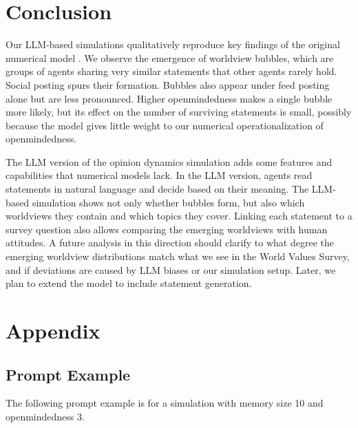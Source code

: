 \documentclass[]{ceurart}
\begin{document}
\section{Conclusion}\label{conclusion}

Our LLM-based simulations qualitatively reproduce key findings of the
original numerical model \citep{GeschkeEtAl2019TriplefilterBubbleUsing}.
We observe the emergence of worldview bubbles, which are groups of
agents sharing very similar statements that other agents rarely hold.
Social posting spurs their formation. Bubbles also appear under feed
posting alone but are less pronounced. Higher openmindedness makes a
single bubble more likely, but its effect on the number of surviving
statements is small, possibly because the model gives little weight to
our numerical operationalization of openmindedness.

The LLM version of the opinion dynamics simulation adds some features
and capabilities that numerical models lack. In the LLM version, agents
read statements in natural language and decide based on their meaning.
The LLM-based simulation shows not only whether bubbles form, but also
which worldviews they contain and which topics they cover. Linking each
statement to a survey question also allows comparing the emerging
worldviews with human attitudes. A future analysis in this direction
should clarify to what degree the emerging worldview distributions match
what we see in the World Values Survey, and if deviations are caused by
LLM biases or our simulation setup. Later, we plan to extend the model
to include statement generation.

\section*{Appendix}\label{appendix}

\subsection{Prompt Example}\label{sec-prompt}

The following prompt example is for a simulation with memory size 10 and
openmindedness 3.
\end{document}
